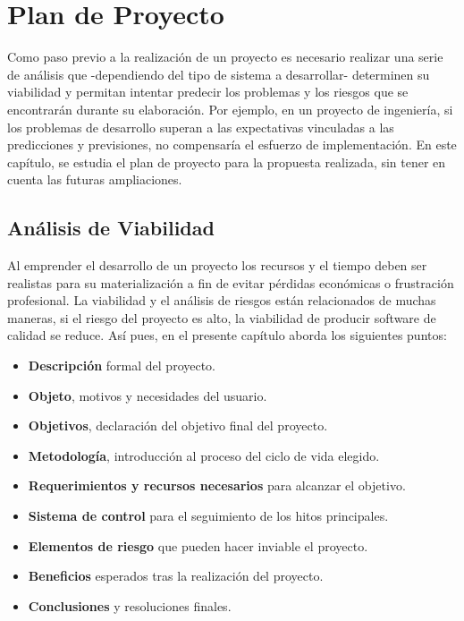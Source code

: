 \chapter[Plan de Proyecto]{
  \label{chp:plan}
  Plan de Proyecto
}
\minitoc
\newpage

Como paso previo a la realización de un proyecto es necesario realizar una serie de
análisis que -dependiendo del tipo de sistema a desarrollar- determinen su
viabilidad y permitan intentar predecir los problemas y los riesgos que se
encontrarán durante su elaboración. Por ejemplo, en un proyecto de ingeniería,
si los problemas de desarrollo superan a las expectativas vinculadas a las
predicciones y previsiones, no compensaría el esfuerzo de implementación.
En este capítulo, se estudia el plan de proyecto para la propuesta realizada,
sin tener en cuenta las futuras ampliaciones.


\section{Análisis de Viabilidad}

Al emprender el desarrollo de un proyecto los recursos y el tiempo deben ser
realistas para su materialización a fin de evitar pérdidas económicas o
frustración profesional. La viabilidad y el análisis de riesgos están relacionados
de muchas maneras, si el riesgo del proyecto es alto, la viabilidad de producir
software de calidad se reduce. Así pues, en el presente capítulo aborda los siguientes
puntos:

\begin{itemize}
    \item \textbf{Descripción} formal del proyecto.
    \item \textbf{Objeto}, motivos y necesidades del usuario.
    \item \textbf{Objetivos}, declaración del objetivo final del proyecto.
    \item \textbf{Metodología}, introducción al proceso del ciclo de vida elegido.
    \item \textbf{Requerimientos y recursos necesarios} para alcanzar el objetivo.
    \item \textbf{Sistema de control} para el seguimiento de los hitos principales.
    \item \textbf{Elementos de riesgo} que pueden hacer inviable el proyecto.
    \item \textbf{Beneficios} esperados tras la realización del proyecto.
    \item \textbf{Conclusiones} y resoluciones finales.
\end{itemize}
